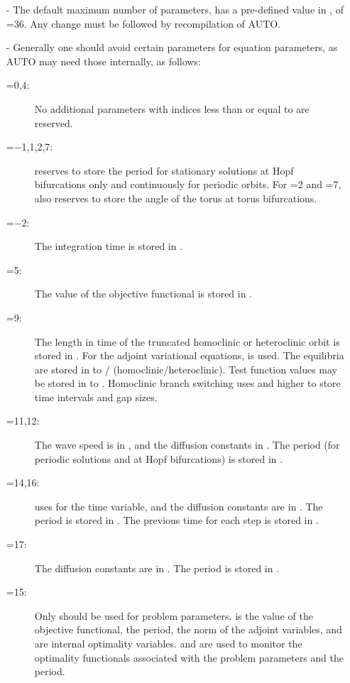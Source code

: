 \documentclass[12pt]{report}
\begin{document}
\begin{itemize}
\item[-]
  The default maximum number of parameters,  has a
  pre-defined value in ,
  of =36.
  Any change  must be followed by recompilation of {\cal AUTO}.
\item[-]
  Generally one should avoid certain parameters for equation parameters,
  as {\cal AUTO} may need those internally, as follows:
\begin{description}
\item[=0,4:]
  No additional parameters with indices less than or equal
  to  are reserved.
\item[=$-$1,1,2,7:]
  \AUTO reserves  to store the period for stationary
  solutions at Hopf bifurcations only and continuously for periodic
  orbits. For =2 and =7, \AUTO also
  reserves  to store the angle of the torus
  at torus bifurcations.
\item[=$-$2:]
  The integration time is stored in .
\item[=5:]
  The value of the objective functional is stored in .
\item[=9:]
  The length in time of the truncated homoclinic or heteroclinic orbit
  is stored in . For the adjoint variational equations,
   is used. The equilibria are stored
  in  to /
  (homoclinic/heteroclinic). Test function values may be stored in
   to . Homoclinic branch switching uses
   and higher to store time intervals and gap sizes.
\item[=11,12:]
  The wave speed is in , and the diffusion 
  constants in . The period (for periodic
  solutions and at Hopf bifurcations) is stored in .
\item[=14,16:]
  \AUTO uses  for the time variable, and the diffusion 
  constants are in . The period is stored in
  . The previous time for each step is stored in .
\item[=17:]
  The diffusion constants are in .
  The period is stored in .
\item[=15:]
  Only  should be used for problem parameters.
   is the value of the objective
  functional,  the period,  the norm of the
  adjoint variables,  and  are internal optimality
  variables.  and  are used to monitor the 
  optimality functionals associated with the problem parameters and
  the period.
\end{description}
\end{itemize}
\end{document}
